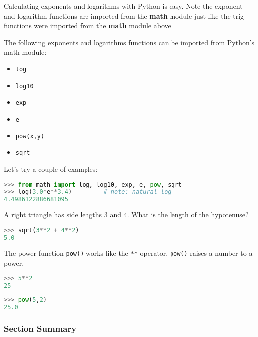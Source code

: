 \documentclass{book}
\providecommand{\tightlist}{%
      \setlength{\itemsep}{0pt}\setlength{\parskip}{0pt}}
\newcommand{\passthrough}[1]{#1}
\begin{document}
    
        Calculating exponents and logarithms with Python is easy. Note the
exponent and logarithm functions are imported from the \textbf{math}
module just like the trig functions were imported from the \textbf{math}
module above.

The following exponents and logarithms functions can be imported from
Python's math module:

\begin{itemize}
\tightlist
\item
  \passthrough{\lstinline!log!}
\item
  \passthrough{\lstinline!log10!}
\item
  \passthrough{\lstinline!exp!}
\item
  \passthrough{\lstinline!e!}
\item
  \passthrough{\lstinline!pow(x,y)!}
\item
  \passthrough{\lstinline!sqrt!}
\end{itemize}

Let's try a couple of examples:

\begin{lstlisting}[language=Python]
>>> from math import log, log10, exp, e, pow, sqrt
>>> log(3.0*e**3.4)         # note: natural log
4.4986122886681095
\end{lstlisting}

A right triangle has side lengths 3 and 4. What is the length of the
hypotenuse?

\begin{lstlisting}[language=Python]
>>> sqrt(3**2 + 4**2)
5.0 
\end{lstlisting}

The power function \passthrough{\lstinline!pow()!} works like the
\passthrough{\lstinline!**!} operator. \passthrough{\lstinline!pow()!}
raises a number to a power.

\begin{lstlisting}[language=Python]
>>> 5**2
25
\end{lstlisting}

\begin{lstlisting}[language=Python]
>>> pow(5,2)
25.0
\end{lstlisting}

\hypertarget{section-summary}{%
\subsubsection{Section Summary}\label{section-summary}}
\end{document}

